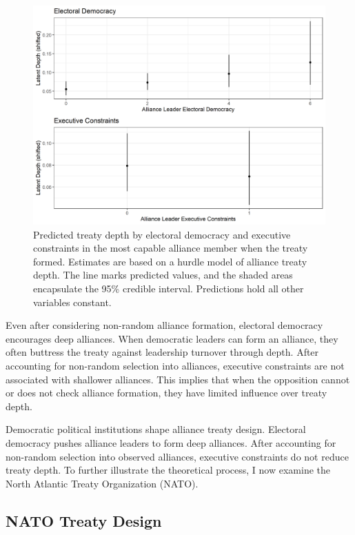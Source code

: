 \documentclass[12pt]{article}
\begin{document}
\begin{figure}
\includegraphics[width=.95\textwidth]{../figures/results-hurdle.png}  
\caption{Predicted treaty depth by electoral democracy and executive constraints in the most capable alliance member when the treaty formed. Estimates are based on a hurdle model of alliance treaty depth. The line marks predicted values, and the shaded areas encapsulate the 95\% credible interval. Predictions hold all other variables constant.}
\label{fig:results-hurdle}
\end{figure}


Even after considering non-random alliance formation, electoral democracy encourages deep alliances. 
When democratic leaders can form an alliance, they often buttress the treaty against leadership turnover through depth. 
After accounting for non-random selection into alliances, executive constraints are not associated with shallower alliances.
This implies that when the opposition cannot or does not check alliance formation, they have limited influence over treaty depth. 


Democratic political institutions shape alliance treaty design. 
Electoral democracy pushes alliance leaders to form deep alliances. 
After accounting for non-random selection into observed alliances, executive constraints do not reduce treaty depth. 
To further illustrate the theoretical process, I now examine the North Atlantic Treaty Organization (NATO).



\subsection{NATO Treaty Design}
\end{document}
